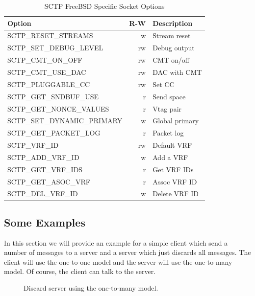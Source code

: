 \documentclass[conference]{IEEEtran}
\begin{document}
\begin{table}[h]
\begin{center}
\begin{tabular}{|l|r|l|}
\hline
Option                      & R-W & Description   \\\hline
\hline
SCTP\_RESET\_STREAMS        & w   & Stream reset  \\\hline
SCTP\_SET\_DEBUG\_LEVEL     & rw  & Debug output  \\\hline
SCTP\_CMT\_ON\_OFF          & rw  & CMT on/off    \\\hline
SCTP\_CMT\_USE\_DAC         & rw  & DAC with CMT  \\\hline
SCTP\_PLUGGABLE\_CC         & rw  & Set CC        \\\hline
SCTP\_GET\_SNDBUF\_USE      & r   & Send space    \\\hline
SCTP\_GET\_NONCE\_VALUES    & r   & Vtag pair     \\\hline
SCTP\_SET\_DYNAMIC\_PRIMARY & w   & Global primary\\\hline
SCTP\_GET\_PACKET\_LOG      & r   & Packet log    \\\hline
SCTP\_VRF\_ID               & rw  & Default VRF   \\\hline
SCTP\_ADD\_VRF\_ID          & w   & Add a VRF     \\\hline
SCTP\_GET\_VRF\_IDS         & r   & Get VRF IDs   \\\hline
SCTP\_GET\_ASOC\_VRF        & r   & Assoc VRF ID  \\\hline
SCTP\_DEL\_VRF\_ID          & w   & Delete VRF ID \\\hline
\end{tabular}
\end{center}
\caption{SCTP FreeBSD Specific Socket Options\label{bsdsockopt}}
\end{table}


\subsection{Some Examples}

In this section we will provide an example for a simple client
which send a number of messages to a server and a server which
just discards all messages. The client will use the one-to-one
model and the server will use the one-to-many model. Of course,
the client can talk to the server.

\begin{figure}[h]
\lstset{numbers=left, frame=single, basicstyle=\footnotesize,}

\caption{Discard server using the one-to-many model.}
\label{fig:discard-server}
\end{figure}
\end{document}
